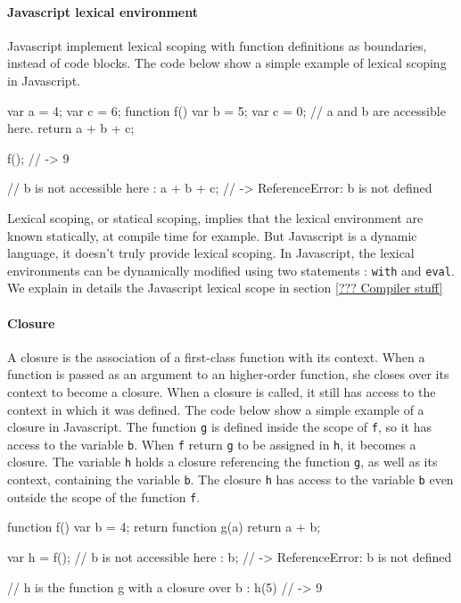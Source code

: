 
\paragraph{Javascript lexical environment}

Javascript implement lexical scoping with function definitions as boundaries, instead of code blocks.
The code below show a simple example of lexical scoping in Javascript.

\begin{code}
  var a = 4;
  var c = 6;
  function f() {
    var b = 5;
    var c = 0;
    // a and b are accessible here.
    return a + b + c;
  }

  f(); // -> 9

  // b is not accessible here :
  a + b + c; // -> ReferenceError: b is not defined
\end{code}

Lexical scoping, or statical scoping, implies that the lexical environment are known statically, at compile time for example.
But Javascript is a dynamic language, it doesn't truly provide lexical scoping.
In Javascript, the lexical environments can be dynamically modified using two statements : \texttt{with} and \texttt{eval}.
We explain in details the Javascript lexical scope in section \ref{??? Compiler stuff}

\paragraph{Closure}

A closure is the association of a first-class function with its context.
When a function is passed as an argument to an higher-order function, she closes over its context to become a closure.
When a closure is called, it still has access to the context in which it was defined.
The code below show a simple example of a closure in Javascript.
The function \texttt{g} is defined inside the scope of \texttt{f}, so it has access to the variable \texttt{b}.
When \texttt{f} return \texttt{g} to be assigned in \texttt{h}, it becomes a closure.
The variable \texttt{h} holds a closure referencing the function \texttt{g}, as well as its context, containing the variable \texttt{b}.
The closure \texttt{h} has access to the variable \texttt{b} even outside the scope of the function \texttt{f}.

\begin{code}
  function f() {
    var b = 4;
    return function g(a) {
      return a + b;
    }
  }

  var h = f();
  // b is not accessible here :
  b; // -> ReferenceError: b is not defined

  // h is the function g with a closure over b :
  h(5) // -> 9
\end{code}


